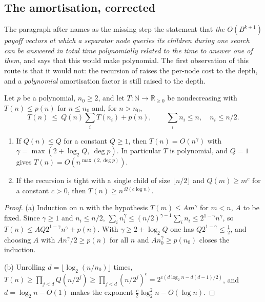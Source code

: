 
\subsection{The amortisation, corrected}\label{wa:sec-amortise}

The paragraph after  names as the missing step the
statement that \emph{the $O(B^{k+1})$ payoff vectors at which a separator node
queries its children during one search can be answered in total time
polynomially related to the time to answer one of them}, and says that this
would make  polynomial. The first observation of this route is that
it would not: the recursion of  raises the per-node cost to the
depth, and a \emph{polynomial} amortisation factor is still raised to the depth.

\begin{lemma}\label{wa:recursion}
Let $p$ be a polynomial, $n_0\ge2$, and let $T:\mathbb N\to\mathbb R_{\ge0}$ be
nondecreasing with $T(n)\le p(n)$ for $n\le n_0$ and, for $n>n_0$,
\[
  T(n)\ \le\ Q(n)\sum_{i}T(n_i)+p(n),
  \qquad \sum_i n_i\le n,\quad n_i\le n/2 .
\]
\begin{enumerate}[label=(\alph*),leftmargin=2.2em]
\item If $Q(n)\le Q$ for a constant $Q\ge1$, then $T(n)=O(n^{\gamma})$ with
      $\gamma=\max(2+\log_2Q,\ \deg p)$. In particular $T$ is polynomial, and
      $Q=1$ gives $T(n)=O(n^{\max(2,\deg p)})$.
\item If the recursion is tight with a single child of size $\lfloor n/2\rfloor$
      and $Q(m)\ge m^{c}$ for a constant $c>0$, then
      $T(n)\ge n^{\,\Omega(c\log n)}$.
\end{enumerate}
\end{lemma}

\begin{proof}
(a) Induction on $n$ with the hypothesis $T(m)\le Am^{\gamma}$ for $m<n$, $A$ to
be fixed. Since $\gamma\ge1$ and $n_i\le n/2$,
$\sum_i n_i^{\gamma}\le(n/2)^{\gamma-1}\sum_i n_i\le 2^{1-\gamma}n^{\gamma}$, so
$T(n)\le AQ2^{1-\gamma}n^{\gamma}+p(n)$. With $\gamma\ge2+\log_2Q$ one has
$Q2^{1-\gamma}\le\tfrac12$, and choosing $A$ with $An^{\gamma}/2\ge p(n)$ for all
$n$ and $A n_0^{\gamma}\ge p(n_0)$ closes the induction.

(b) Unrolling $d=\lfloor\log_2(n/n_0)\rfloor$ times,
$T(n)\ge\prod_{j<d}Q(n/2^{j})\ge\prod_{j<d}(n/2^{j})^{c}
=2^{c(d\log_2n-d(d-1)/2)}$, and $d=\log_2 n-O(1)$ makes the exponent
$\tfrac{c}{2}\log_2^2n-O(\log n)$.
\end{proof}

